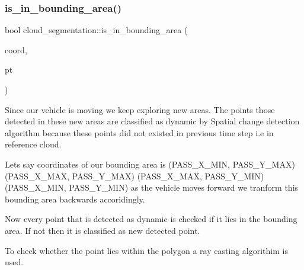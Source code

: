 \mbox{\label{classdatmo_1_1cloud__segmentation_a5bcf85ac924671c64840ac2087877a5f}} 
\subsubsection{\texorpdfstring{is\+\_\+in\+\_\+bounding\+\_\+area()}{is\_in\_bounding\_area()}}
{\footnotesize\ttfamily bool cloud\+\_\+segmentation\+::is\+\_\+in\+\_\+bounding\+\_\+area (\begin{DoxyParamCaption}\item[{const pcl\+::\+Point\+Cloud$<$ pcl\+::\+Point\+X\+YZ $>$\+::Ptr \&}]{coord,  }\item[{pcl\+::\+Point\+X\+Y\+Z\+R\+GB}]{pt }\end{DoxyParamCaption})\hspace{0.3cm}{\ttfamily [private]}}

Since our vehicle is moving we keep exploring new areas. The points those detected in these new areas are classified as dynamic by Spatial change detection algorithm because these points did not existed in previous time step i.\+e in reference cloud.

Lets say coordinates of our bounding area is (P\+A\+S\+S\+\_\+\+X\+\_\+\+M\+IN, P\+A\+S\+S\+\_\+\+Y\+\_\+\+M\+AX) (P\+A\+S\+S\+\_\+\+X\+\_\+\+M\+AX, P\+A\+S\+S\+\_\+\+Y\+\_\+\+M\+AX) (P\+A\+S\+S\+\_\+\+X\+\_\+\+M\+AX, P\+A\+S\+S\+\_\+\+Y\+\_\+\+M\+IN) (P\+A\+S\+S\+\_\+\+X\+\_\+\+M\+IN, P\+A\+S\+S\+\_\+\+Y\+\_\+\+M\+IN) as the vehicle moves forward we tranform this bounding area backwards accoridingly.

Now every point that is detected as dynamic is checked if it lies in the bounding area. If not then it is classified as new detected point.

To check whether the point lies within the polygon a ray casting algorithim is used.

